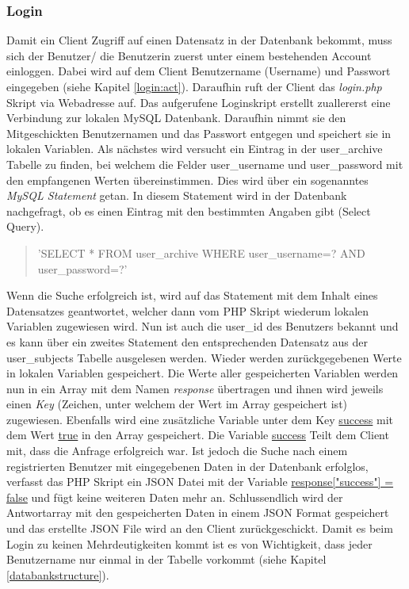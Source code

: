 \documentclass[a4paper,11pt]{report}
\begin{document}
					\subsubsection{Login}\label{login:php}
					Damit ein Client Zugriff auf einen Datensatz in der Datenbank bekommt, muss sich der Benutzer/ die Benutzerin zuerst unter einem bestehenden Account einloggen. Dabei wird auf dem Client Benutzername (Username) und Passwort eingegeben (siehe Kapitel \ref{login:act}). Daraufhin ruft der Client das \emph{login.php} Skript via Webadresse auf. Das aufgerufene Loginskript erstellt zuallererst eine Verbindung zur lokalen MySQL Datenbank. Daraufhin nimmt sie den Mitgeschickten Benutzernamen und das Passwort entgegen und speichert sie in lokalen Variablen. Als nächstes wird versucht ein Eintrag in der user\_archive Tabelle zu finden, bei welchem die Felder user\_username und user\_password mit den empfangenen Werten übereinstimmen. Dies wird über ein sogenanntes \emph{MySQL Statement} getan. In diesem Statement wird in der Datenbank nachgefragt, ob es einen Eintrag mit den bestimmten Angaben gibt (Select Query).
					\begin{quotation}
						{\selectfont\noindent 'SELECT * FROM user\_archive WHERE user\_username=? AND user\_password=?'}
					\end{quotation}
				
					Wenn die Suche erfolgreich ist, wird auf das Statement mit dem Inhalt eines Datensatzes geantwortet, welcher dann vom PHP Skript wiederum lokalen Variablen zugewiesen wird. Nun ist auch die user\_id des Benutzers bekannt und es kann über ein zweites Statement den entsprechenden Datensatz aus der user\_subjects Tabelle ausgelesen werden. Wieder werden zurückgegebenen Werte in lokalen Variablen gespeichert. Die Werte aller gespeicherten Variablen werden nun in ein Array mit dem Namen \emph{response} übertragen und ihnen wird jeweils einen \emph{Key} (Zeichen, unter welchem der Wert im Array gespeichert ist) zugewiesen. Ebenfalls wird eine zusätzliche Variable unter dem Key \url{success} mit dem Wert \url{true} in den Array gespeichert. Die Variable \url{success} Teilt dem Client mit, dass die Anfrage erfolgreich war. Ist jedoch die Suche nach einem registrierten Benutzer mit eingegebenen Daten in der Datenbank erfolglos, verfasst das PHP Skript ein JSON Datei mit der Variable \url{response["success"] = false} und fügt keine weiteren Daten mehr an. Schlussendlich wird der Antwortarray mit den gespeicherten Daten in einem JSON Format gespeichert und das erstellte JSON File wird an den Client zurückgeschickt. Damit es beim Login zu keinen Mehrdeutigkeiten kommt ist es von Wichtigkeit, dass jeder Benutzername nur einmal in der Tabelle vorkommt (siehe Kapitel \ref{databankstructure}).
\end{document}
